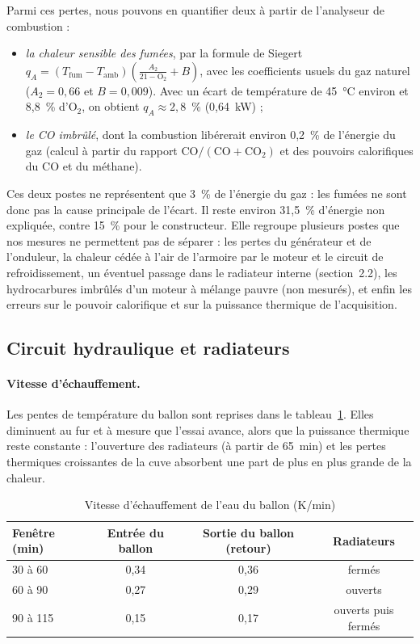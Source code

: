Parmi ces pertes, nous pouvons en quantifier deux à partir de
l'analyseur de combustion :
\begin{itemize}
  \item \emph{la chaleur sensible des fumées}, par la formule de
  Siegert $q_A = (T_{\mathrm{fum}} - T_{\mathrm{amb}}) \left(\frac{A_2}{21 - \mathrm{O}_2} + B\right)$,
  avec les coefficients usuels du gaz naturel ($A_2 = 0{,}66$ et
  $B = 0{,}009$). Avec un écart de température de 45~°C environ et
  8,8~\% d'O$_2$, on obtient $q_A \approx 2{,}8$~\% (0,64~kW) ;
  \item \emph{le CO imbrûlé}, dont la combustion libérerait environ
  0,2~\% de l'énergie du gaz (calcul à partir du rapport
  $\mathrm{CO}/(\mathrm{CO} + \mathrm{CO}_2)$ et des pouvoirs
  calorifiques du CO et du méthane).
\end{itemize}
Ces deux postes ne représentent que 3~\% de l'énergie du gaz : les
fumées ne sont donc pas la cause principale de l'écart. Il reste
environ 31,5~\% d'énergie non expliquée, contre 15~\% pour le
constructeur. Elle regroupe plusieurs postes que nos mesures ne
permettent pas de séparer : les pertes du générateur et de l'onduleur,
la chaleur cédée à l'air de l'armoire par le moteur et le circuit de
refroidissement, un
éventuel passage dans le radiateur interne (section~2.2), les
hydrocarbures imbrûlés d'un moteur à mélange pauvre (non mesurés), et
enfin les erreurs sur le pouvoir calorifique et sur la puissance
thermique de l'acquisition.

\subsection{Circuit hydraulique et radiateurs}
\label{sec:hydraulique}

\paragraph{Vitesse d'échauffement.} Les pentes de température du ballon
sont reprises dans le tableau~\ref{tab:pentes}. Elles diminuent au fur
et à mesure que l'essai avance, alors que la puissance thermique reste
constante : l'ouverture des radiateurs (à partir de 65~min) et les
pertes thermiques croissantes de la cuve absorbent une part de plus en
plus grande de la chaleur.

\begin{table}[htbp]
  \centering
  \caption{Vitesse d'échauffement de l'eau du ballon (K/min)}
  \label{tab:pentes}
  \begin{tabular}{lccc}
    \toprule
    Fenêtre (min) & Entrée du ballon & Sortie du ballon (retour) & Radiateurs \\
    \midrule
    30 à 60  & 0,34 & 0,36 & fermés \\
    60 à 90  & 0,27 & 0,29 & ouverts \\
    90 à 115 & 0,15 & 0,17 & ouverts puis fermés \\
    \bottomrule
  \end{tabular}
\end{table}

